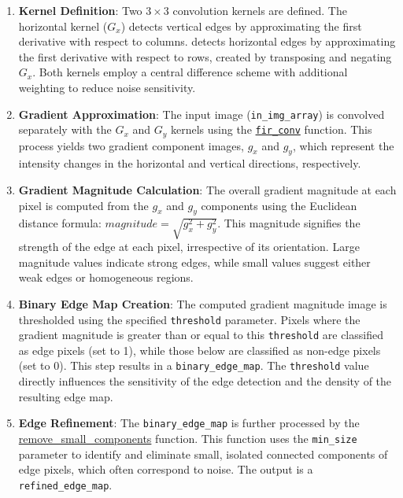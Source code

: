 \documentclass[12pt,a4paper]{article}
\begin{document}
\begin{enumerate}
    \item \textbf{Kernel Definition}: Two $3 \times 3$ convolution kernels are defined. The horizontal kernel ($G_x$) detects vertical edges by approximating the first derivative with respect to columns. detects horizontal edges by approximating the first derivative with respect to rows, created by transposing and negating $G_x$. Both kernels employ a central difference scheme with additional weighting to reduce noise sensitivity.
    
    \item \textbf{Gradient Approximation}: The input image (\texttt{in\_img\_array}) is convolved separately with the $G_x$ and $G_y$ kernels using the \href{Code/fir_conv.py}{\texttt{fir\_conv}} function. This process yields two gradient component images, $g_x$ and $g_y$, which represent the intensity changes in the horizontal and vertical directions, respectively.
    
    \item \textbf{Gradient Magnitude Calculation}: The overall gradient magnitude at each pixel is computed from the $g_x$ and $g_y$ components using the Euclidean distance formula: $magnitude = \sqrt{g_x^2 + g_y^2}$. This magnitude signifies the strength of the edge at each pixel, irrespective of its orientation. Large magnitude values indicate strong edges, while small values suggest either weak edges or homogeneous regions.
    
    \item \textbf{Binary Edge Map Creation}: The computed gradient magnitude image is thresholded using the specified \texttt{threshold} parameter. Pixels where the gradient magnitude is greater than or equal to this \texttt{threshold} are classified as edge pixels (set to 1), while those below are classified as non-edge pixels (set to 0). This step results in a \texttt{binary\_edge\_map}. The \texttt{threshold} value directly influences the sensitivity of the edge detection and the density of the resulting edge map.

    \item \textbf{Edge Refinement}: The \texttt{binary\_edge\_map} is further processed by the \url{remove\_small\_components} function. This function uses the \texttt{min\_size} parameter to identify and eliminate small, isolated connected components of edge pixels, which often correspond to noise. The output is a \texttt{refined\_edge\_map}.

\end{enumerate}
\end{document}
